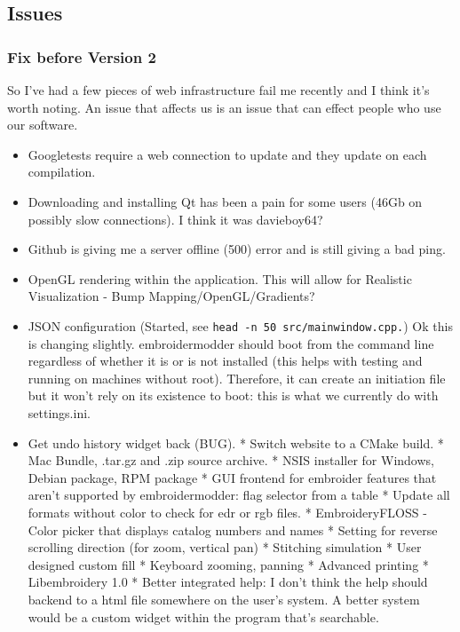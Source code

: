 \documentclass[11pt]{report}
\begin{document}
\subsection{Issues}

\subsubsection{Fix before Version 2}

So I've had a few pieces of web infrastructure fail me recently and I
think it's worth noting. An issue that affects us is an issue that can
effect people who use our software.

\begin{itemize}
\item Googletests require a web connection to update and they update on each
      compilation.
\item Downloading and installing Qt has been a pain for some users (46Gb on
      possibly slow connections). I think it was davieboy64?
\item Github is giving me a server offline (500) error and is still giving a bad
      ping.
\item OpenGL rendering within the application. This will allow for Realistic
      Visualization - Bump Mapping/OpenGL/Gradients?
\item JSON configuration (Started, see \texttt{head\ -n\ 50\ src/mainwindow.cpp.})
      Ok this is changing slightly. embroidermodder should boot from the command
      line regardless of whether it is or is not installed (this helps with
      testing and running on machines without root). Therefore, it can create
      an initiation file but it won't rely on its existence to boot: this is
      what we currently do with settings.ini.
\item Get undo history widget back (BUG).
* Switch website to a CMake build.
* Mac Bundle, .tar.gz and .zip source archive.
* NSIS installer for Windows, Debian package, RPM package
* GUI frontend for embroider features that aren't supported by  embroidermodder: flag selector from a table
* Update all formats without color to check for edr or rgb files.
* EmbroideryFLOSS - Color picker that displays catalog numbers and names
* Setting for reverse scrolling direction (for zoom, vertical pan)
* Stitching simulation
* User designed custom fill
* Keyboard zooming, panning
* Advanced printing
* Libembroidery 1.0
* Better integrated help: I don't think the help should backend to a html file somewhere on the user's system. A better system would be a custom widget within the program that's searchable.

\end{itemize}
\end{document}
